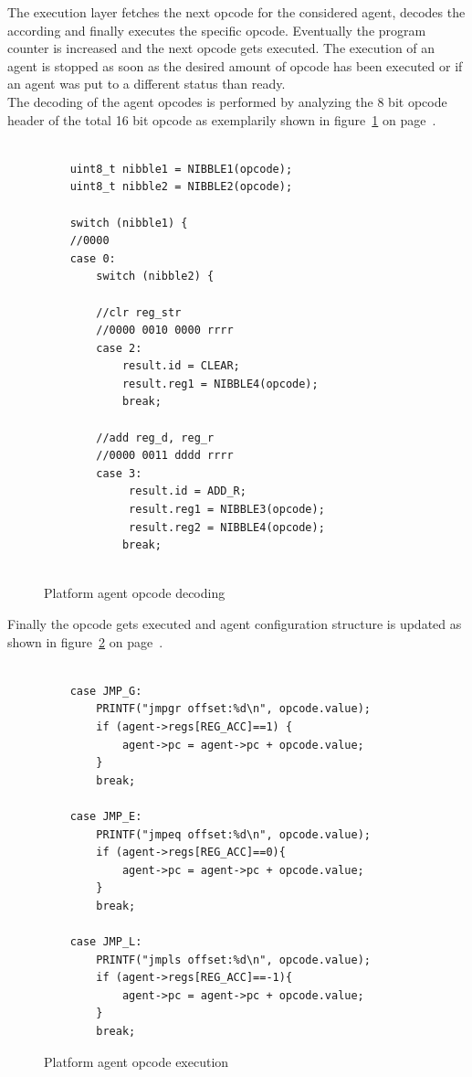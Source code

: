 \documentclass{scrreprt}
\begin{document}
\noindent
The execution layer fetches the next opcode for the considered agent, decodes the according and finally executes the specific 
opcode. Eventually the program counter is increased and the next opcode gets executed. The execution of an agent is stopped
as soon as the desired amount of opcode has been executed or if an agent was put to a different status than ready.\\

\noindent
The decoding of the agent opcodes is performed by analyzing the 8 bit opcode header of the total 16 bit opcode as exemplarily
shown in figure~\ref{fig:platform-agent-opcode-dec} on page~\pageref{fig:platform-agent-opcode-dec}.\\

\begin{figure}[!htb]
\lstset{language=C, tabsize=2}
\begin{lstlisting}[frame=single]

	uint8_t nibble1 = NIBBLE1(opcode);
	uint8_t nibble2 = NIBBLE2(opcode);

	switch (nibble1) {
	//0000
	case 0:
		switch (nibble2) {

		//clr reg_str
		//0000 0010 0000 rrrr
		case 2:
			result.id = CLEAR;
			result.reg1 = NIBBLE4(opcode);
			break;

		//add reg_d, reg_r
		//0000 0011 dddd rrrr
		case 3:
			 result.id = ADD_R;
			 result.reg1 = NIBBLE3(opcode);
			 result.reg2 = NIBBLE4(opcode);
			break;


\end{lstlisting}
\caption{Platform agent opcode decoding}
\label{fig:platform-agent-opcode-dec}
\end{figure}

\noindent
Finally the opcode gets executed and agent configuration structure is updated as shown in figure~\ref{fig:platform-agent-opcode-exec} on page~\pageref{fig:platform-agent-opcode-exec}.\\

\begin{figure}[!htb]
\lstset{language=C, tabsize=2}
\begin{lstlisting}[frame=single]
	
	case JMP_G:
		PRINTF("jmpgr offset:%d\n", opcode.value);
		if (agent->regs[REG_ACC]==1) {
			agent->pc = agent->pc + opcode.value;
		}
		break;

	case JMP_E:
		PRINTF("jmpeq offset:%d\n", opcode.value);
		if (agent->regs[REG_ACC]==0){
			agent->pc = agent->pc + opcode.value;
		}
		break;

	case JMP_L:
		PRINTF("jmpls offset:%d\n", opcode.value);
		if (agent->regs[REG_ACC]==-1){
			agent->pc = agent->pc + opcode.value;
		}
		break;

\end{lstlisting}
\caption{Platform agent opcode execution}
\label{fig:platform-agent-opcode-exec}
\end{figure}
\end{document}
